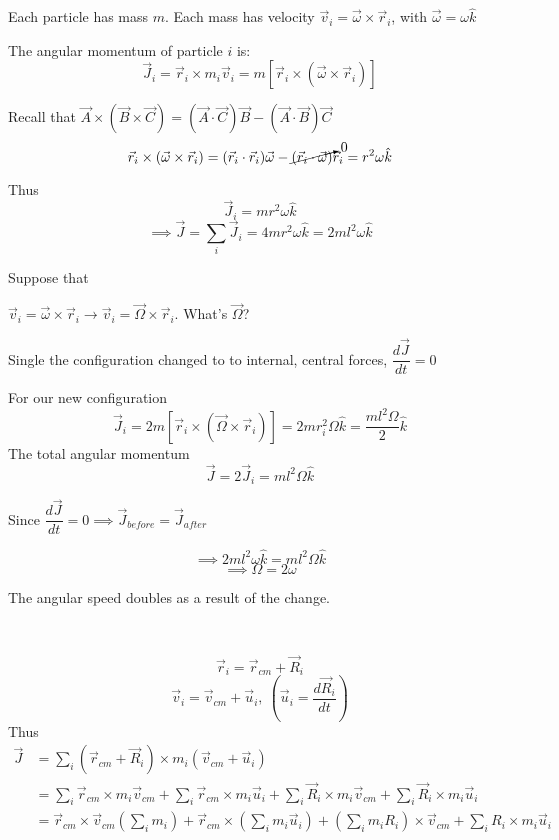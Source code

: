 \begin{example}
\vspace*{50pt}

Each particle has mass $m$. Each mass has velocity $\vec{v}_i = \vec{\omega} \times \vec{r}_i$, with $\vec{\omega} = \omega\hat{k}$	

The angular momentum of particle $i$ is:
\[\vec{J}_i = \vec{r}_i \times m_i\vec{v}_i = m[\vec{r}_i \times (\vec{\omega} \times \vec{r}_i)]\]

Recall that $\vec{A} \times (\vec{B} \times \vec{C}) = (\vec{A}\cdot\vec{C})\vec{B} - (\vec{A}\cdot\vec{B})\vec{C}$
\[\vec{r}_i \times (\vec{\omega} \times \vec{r}_i) = (\vec{r}_i \cdot \vec{r}_i)\vec{\omega} - \cancelto{0}{(\vec{r}_i \cdot \vec{\omega})}\vec{r}_i = r^2\omega\hat{k}\]

Thus 
\[\vec{J}_i = mr^2\omega\hat{k}\]
\[\implies \vec{J} = \sum_i \vec{J}_i = 4mr^2\omega\hat{k} = 2ml^2\omega\hat{k}\]

Suppose that 
\vspace*{50pt}

$\vec{v}_i = \vec{\omega} \times \vec{r}_i \longrightarrow \vec{v}_i = \vec{\Omega} \times\vec{r}_i$. What's $\vec{\Omega}$?

Single the configuration changed to to internal, central forces, $\dfrac{d\vec{J}}{dt} = 0$

For our new configuration
\[\vec{J}_i = 2m[\vec{r}_i \times (\vec{\Omega} \times \vec{r}_i)] = 2mr_i^2\Omega\hat{k} = \frac{ml^2\Omega}{2}\hat{k}\]
The total angular momentum
\[\vec{J} = 2\vec{J}_i = ml^2\Omega\hat{k}\]

Since $\dfrac{d\vec{J}}{dt} = 0 \implies \vec{J}_{before} = \vec{J}_{after}$

\[\implies 2ml^2\omega\hat{k}= ml^2\Omega\hat{k}\]
\[\implies \Omega = 2\omega\]

The angular speed doubles as a result of the change. 
\end{example}~\\


\[\vec{r}_i = \vec{r}_{cm} + \vec{R}_i\]
\[\vec{v}_i = \vec{v}_{cm} + \vec{u}_i,~\left(\vec{u}_i = \frac{d\vec{R}_i}{dt}\right)\]
Thus
\[\begin{aligned}
\vec{J} &= \sum_i (\vec{r}_{cm} + \vec{R}_i) \times m_i(\vec{v}_{cm} + \vec{u}_i)\\
&= \sum_i \vec{r}_{cm} \times m_i\vec{v}_{cm} + \sum_i \vec{r}_{cm} \times m_i\vec{u}_i + \sum_i \vec{R}_i \times m_i\vec{v}_{cm} + \sum_i \vec{R}_i \times m_i\vec{u}_i\\
&= \vec{r}_{cm}\times \vec{v}_{cm}(\sum_i m_i) + \vec{r}_{cm} \times (\sum_i m_i\vec{u}_i) + (\sum_im_iR_i)\times\vec{v}_{cm} + \sum_iR_i\times m_i\vec{u}_i
\end{aligned}
\]

